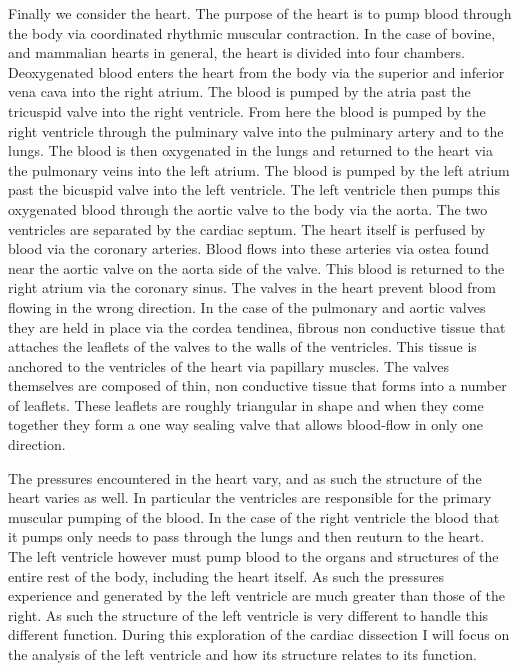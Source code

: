 \documentclass[12pt]{article}
\begin{document}
Finally we consider the heart. The purpose of the heart is to pump blood through the body via coordinated rhythmic muscular contraction. In the case of bovine, and mammalian hearts in general, the heart is divided into four chambers. Deoxygenated blood enters the heart from the body via the superior and inferior vena cava into the right atrium. The blood is pumped by the atria past the tricuspid valve into the right ventricle. From here the blood is pumped by the right ventricle through the pulminary valve into the pulminary artery and to the lungs. The blood is then oxygenated in the lungs and returned to the heart via the pulmonary veins into the left atrium. The blood is pumped by the left atrium past the bicuspid valve into the left ventricle. The left ventricle then pumps this oxygenated blood through the aortic valve to the body via the aorta. The two ventricles are separated by the cardiac septum. The heart itself is perfused by blood via the coronary arteries. Blood flows into these arteries via ostea found near the aortic valve on the aorta side of the valve. This blood is returned to the right atrium via the coronary sinus. The valves in the heart prevent blood from flowing in the wrong direction. In the case of the pulmonary and aortic valves they are held in place via the cordea tendinea, fibrous non conductive tissue that attaches the leaflets of the valves to the walls of the ventricles. This tissue is anchored to the ventricles of the heart via papillary muscles. The valves themselves are composed of thin, non conductive tissue that forms into a number of leaflets. These leaflets are roughly triangular in shape and when they come together they form a one way sealing valve that allows blood-flow in only one direction.\cite{Aurigemma2006}
\par{}
The pressures encountered in the heart vary, and as such the structure of the heart varies as well. In particular the ventricles are responsible for the primary muscular pumping of the blood. In the case of the right ventricle the blood that it pumps only needs to pass through the lungs and then reuturn to the heart. The left ventricle however must pump blood to the organs and structures of the entire rest of the body, including the heart itself. As such the pressures experience and generated by the left ventricle are much greater than those of the right. As such the structure of the left ventricle is very different to handle this different function. During this exploration of the cardiac dissection I will focus on the analysis of the left ventricle and how its structure relates to its function.
\end{document}
